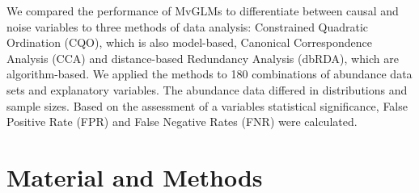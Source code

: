 \documentclass[a4paper,11pt]{article}
\begin{document}

	
	We compared the performance of MvGLMs to differentiate between causal and noise variables to three methods of data analysis: 
	Constrained Quadratic Ordination (CQO), which is also model-based, Canonical Correspondence Analysis (CCA) and distance-based Redundancy Analysis (dbRDA), which are algorithm-based.
	We applied the methods to 180 combinations of abundance data sets and explanatory variables.
	The abundance data differed in distributions and sample sizes. 
    Based on the assessment of a variables statistical significance, False Positive Rate (FPR) and False Negative Rates (FNR) were calculated. 
\section{Material and Methods}
    

\end{document}
